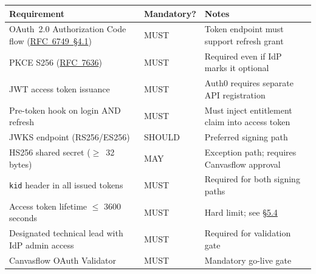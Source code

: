 \begin{longtable}{@{}p{5cm}p{2cm}p{5cm}@{}}
\toprule
\textbf{Requirement} & \textbf{Mandatory?} & \textbf{Notes} \\
\midrule
\endhead
OAuth~2.0 Authorization Code flow (\href{https://datatracker.ietf.org/doc/html/rfc6749#section-4.1}{RFC~6749~\S4.1}) & MUST & Token endpoint must support refresh grant \\[4pt]
PKCE S256 (\href{https://datatracker.ietf.org/doc/html/rfc7636}{RFC~7636}) & MUST & Required even if IdP marks it optional \\[4pt]
JWT access token issuance & MUST & Auth0 requires separate API registration \\[4pt]
Pre-token hook on login AND refresh & MUST & Must inject entitlement claim into access token \\[4pt]
JWKS endpoint (RS256/ES256) & SHOULD & Preferred signing path \\[4pt]
HS256 shared secret ($\geq$~32 bytes) & MAY & Exception path; requires Canvasflow approval \\[4pt]
\texttt{kid} header in all issued tokens & MUST & Required for both signing paths \\[4pt]
Access token lifetime $\leq$ 3600 seconds & MUST & Hard limit; see \hyperref[sec:required-payload-claims]{\S5.4} \\[4pt]
Designated technical lead with IdP admin access & MUST & Required for validation gate \\[4pt]
Canvasflow OAuth Validator & MUST & Mandatory go-live gate \\
\bottomrule
\end{longtable}
